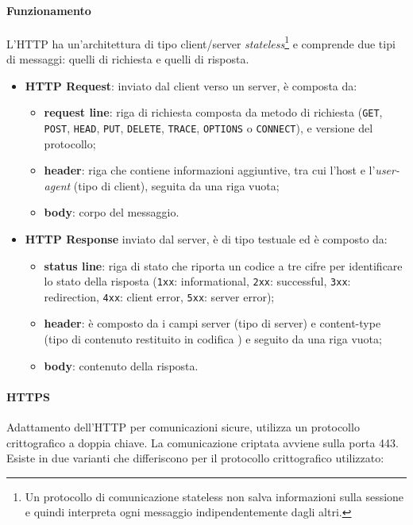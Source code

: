 \documentclass[a4paper, twoside]{article}
\def\code#1{\texttt{#1}}
\def\para#1{\paragraph{#1}\label{#1}}
\def\vedi#1{\nameref{#1}}
\def\italic#1{\textit{#1}}
\begin{document}
\paragraph{Funzionamento} L'HTTP ha un'architettura di tipo client/server \italic{stateless}\footnote{Un protocollo di comunicazione stateless non salva informazioni sulla sessione e quindi interpreta ogni messaggio indipendentemente dagli altri.} e comprende due tipi di messaggi: quelli di richiesta e quelli di risposta.
\begin{itemize}
\item \textbf{HTTP Request}: inviato dal client verso un server, è composta da:
\begin{itemize}
\item \textbf{request line}: riga di richiesta composta da metodo di richiesta (\code{GET}, \code{POST}, \code{HEAD}, \code{PUT}, \code{DELETE}, \code{TRACE}, \code{OPTIONS} o \code{CONNECT}), \vedi{URI} e versione del protocollo;
\item \textbf{header}: riga che contiene informazioni aggiuntive, tra cui l'host e l'\textit{user-agent} (tipo di client), seguita da una riga vuota;
\item \textbf{body}: corpo del messaggio.
\end{itemize}
\item \textbf{HTTP Response} inviato dal server, è di tipo testuale ed è composto da:
\begin{itemize}
\item \textbf{status line}: riga di stato che riporta un codice a tre cifre per identificare lo stato della risposta (\code{1xx}: informational, \code{2xx}: successful, \code{3xx}: redirection, \code{4xx}: client error, \code{5xx}: server error);
\item \textbf{header}: è composto da i campi server (tipo di server) e content-type (tipo di contenuto restituito in codifica \vedi{MIME}) e seguito da una riga vuota;
\item \textbf{body}: contenuto della risposta.
\end{itemize}
\end{itemize}
\para{HTTPS} Adattamento dell'HTTP per comunicazioni sicure, utilizza un protocollo crittografico a doppia chiave. La comunicazione criptata avviene sulla porta 443. Esiste in due varianti che differiscono per il protocollo crittografico  utilizzato:
\end{document}

